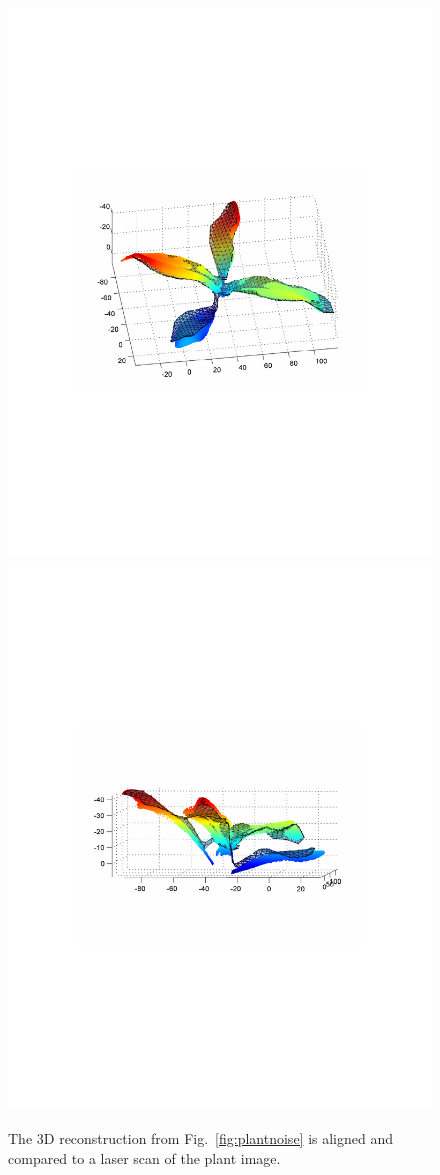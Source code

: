 \begin{figure}
\begin{center}
\includegraphics[trim=120 220 120 220,clip,width=0.8\linewidth]{Figures/plantMeshGT-01}
\includegraphics[trim=120 220 120 220,clip,width=0.8\linewidth]{Figures/plantMeshGT-02}
\end{center}
   \caption{ The $3$D reconstruction from Fig.~\ref{fig:plantnoise} is aligned and compared to a laser scan of the plant image.  }
\label{fig:plantnoiseGT}
\end{figure}

